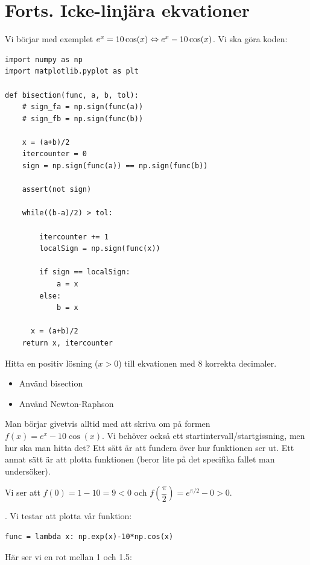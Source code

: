 \section{Forts. Icke-linjära ekvationer}

\noindent Vi börjar med exemplet $e^x=10\cos(x) \Leftrightarrow e^x-10\cos(x)$. Vi ska göra koden:
\par\bigskip

\begin{verbatim}
import numpy as np
import matplotlib.pyplot as plt

def bisection(func, a, b, tol):
    # sign_fa = np.sign(func(a))
    # sign_fb = np.sign(func(b))

    x = (a+b)/2
    itercounter = 0
    sign = np.sign(func(a)) == np.sign(func(b))

    assert(not sign)

    while((b-a)/2) > tol:
        
        itercounter += 1
        localSign = np.sign(func(x))

        if sign == localSign:
            a = x
        else:
            b = x

      x = (a+b)/2
    return x, itercounter
\end{verbatim}
\par\bigskip
\noindent Hitta en positiv lösning ($x>0$) till ekvationen med 8 korrekta decimaler.

\begin{itemize}
  \item Använd bisection
  \item Använd Newton-Raphson
\end{itemize}
\par\bigskip
\noindent Man börjar givetvis alltid med att skriva om på formen $f(x) = e^x-10\cos(x)$. Vi behöver också ett startintervall/startgissning, men hur ska man hitta det? Ett sätt är att fundera över hur funktionen ser ut. Ett annat sätt är att plotta funktionen (beror lite på det specifika fallet man undersöker). \par\noindent Vi ser att $f(0) = 1-10 = 9 <0$ och $f(\dfrac{\pi}{2}) = e^{\pi/2}-0 > 0$.\par\noindent. Vi testar att plotta vår funktion:

\begin{verbatim}
func = lambda x: np.exp(x)-10*np.cos(x) 
\end{verbatim}
\par\bigskip
\noindent Här ser vi en rot mellan 1 och 1.5:

